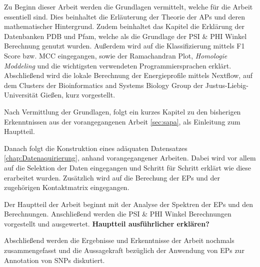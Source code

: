 Zu Beginn dieser Arbeit werden die Grundlagen vermittelt, welche für die Arbeit essentiell sind. Dies beinhaltet die Erläuterung der Theorie der \ac{APs} und deren mathematischer Hintergrund. Zudem beinhaltet das Kapitel die Erklärung der Datenbanken \ac{PDB} und \ac{Pfam}, welche als die Grundlage der PSI \& PHI Winkel Berechnung genutzt wurden. 
Außerdem wird auf die Klassifizierung mittels F1 Score bzw. \ac{MCC} eingegangen, sowie der Ramachandran Plot, \emph{Homologie Moddeling} und die wichtigsten verwendeten Programmiersprachen
erklärt. Abschließend wird die lokale Berechnung der Energieprofile mittels Nextflow, auf dem Clusters der Bioinformatics and Systems Biology Group der Justus-Liebig-Universität Gießen, kurz vorgestellt.

Nach Vermittlung der Grundlagen, folgt ein kurzes Kapitel zu den bisherigen Erkenntnissen aus der vorangegangenen Arbeit \ref{sec:sapa}, als Einleitung zum Hauptteil.

Danach folgt die Konstruktion eines adäquaten Datensatzes \ref{chap:Datenaquirierung}, anhand vorangegangener Arbeiten\cite{Mathias.2014}. Dabei wird vor allem auf die Selektion der Daten eingegangen und Schritt für Schritt erklärt wie diese erarbeitet wurden. Zusätzlich wird auf die Berechung der \ac{EPs} und der zugehörigen Kontaktmatrix eingegangen.

Der Hauptteil der Arbeit beginnt mit der Analyse der Spektren der \ac{EPs} und den Berechnungen. Anschließend werden die PSI \& PHI Winkel Berechnungen vorgestellt und ausgewertet. \textbf{Hauptteil ausführlicher erklären?}



Abschließend werden die Ergebnisse und Erkenntnisse der Arbeit nochmals zusammengefasst und die Aussagekraft bezüglich der Anwendung von \ac{EPs} zur Annotation von \ac{SNPs} diskutiert.


